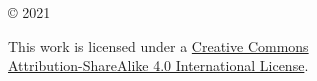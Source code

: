 \begin{center}
  \copyright{} 2021 \theauthor

  \vspace{1.5em}
  \thetitle

  \vspace{1.5em}
  \ccbysa

  \vspace{0.5em}
  This work is licensed under
  a \href{https://creativecommons.org/licenses/by-sa/4.0}{Creative Commons\\
  Attribution-ShareAlike 4.0 International License}.

  \vspace{1.5em}
\end{center}
